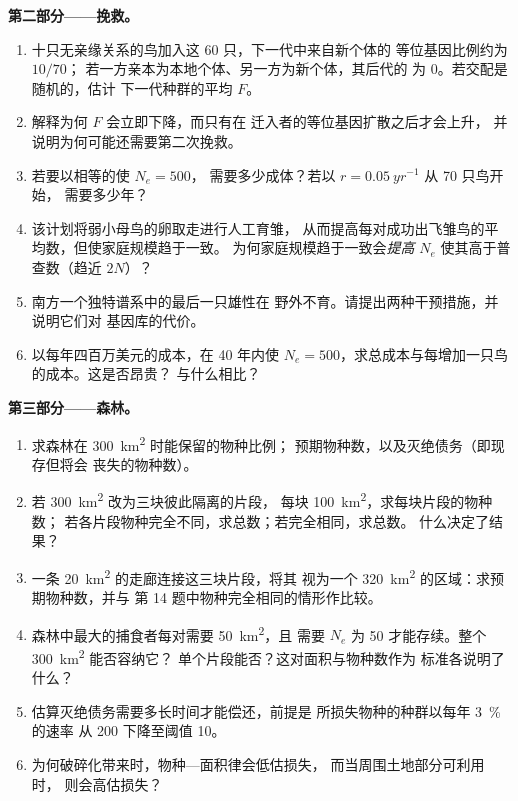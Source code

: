 \begin{problem}
\medskip
\noindent\textbf{第二部分——挽救。}
\begin{enumerate}[resume]
  \item 十只无亲缘关系的鸟加入这 60 只，下一代中来自新个体的
        等位基因比例约为 $10/70$；
        若一方亲本为本地个体、另一方为新个体，其后代的
        为 $0$。若交配是随机的，估计
        下一代种群的平均 $F$。
  \item 解释为何 $F$ 会立即下降，而只有在
        迁入者的等位基因扩散之后才会上升，
        并说明为何可能还需要第二次挽救。
  \item 若要以相等的使 $N_{e} = 500$，
        需要多少成体？若以 $r = \qty{0.05}{yr^{-1}}$ 从 70 只鸟开始，
        需要多少年？
  \item 该计划将弱小母鸟的卵取走进行人工育雏，
        从而提高每对成功出飞雏鸟的平均数，但使家庭规模趋于一致。
        为何家庭规模趋于一致会\emph{提高}
        $N_{e}$ 使其高于普查数（趋近 $2N$）？
  \item 南方一个独特谱系中的最后一只雄性在
        野外不育。请提出两种干预措施，并说明它们对
        基因库的代价。
  \item 以每年四百万美元的成本，在 40 年内使
        $N_{e} = 500$，求总成本与每增加一只鸟的成本。这是否昂贵？
        与什么相比？
\end{enumerate}

\medskip
\noindent\textbf{第三部分——森林。}
\begin{enumerate}[resume]
  \item 求森林在 \qty{300}{km^2} 时能保留的物种比例；
        预期物种数，以及灭绝债务（即现存但将会
        丧失的物种数）。
  \item 若 \qty{300}{km^2} 改为三块彼此隔离的片段，
        每块 \qty{100}{km^2}，求每块片段的物种数；
        若各片段物种完全不同，求总数；若完全相同，求总数。
        什么决定了结果？
  \item 一条 \qty{20}{km^2} 的走廊连接这三块片段，将其
        视为一个 \qty{320}{km^2} 的区域：求预期物种数，并与
        第 14 题中物种完全相同的情形作比较。
  \item 森林中最大的捕食者每对需要 \qty{50}{km^2}，且
        需要 $N_{e}$ 为 50 才能存续。整个 \qty{300}{km^2} 能否容纳它？
        单个片段能否？这对面积与物种数作为
        标准各说明了什么？
  \item 估算灭绝债务需要多长时间才能偿还，前提是
        所损失物种的种群以每年 \qty{3}{\%} 的速率
        从 200 下降至阈值 10。
  \item 为何破碎化带来时，物种—面积律会低估损失，
        而当周围土地部分可利用时，
        则会高估损失？
\end{enumerate}


\end{problem}
